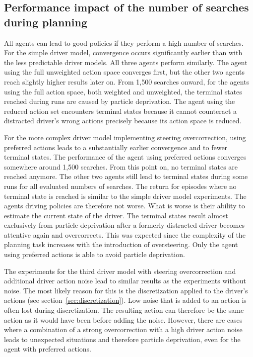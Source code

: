 \subsection{Performance impact of the number of searches during planning}

All agents can lead to good policies if they perform a high number of searches. For the simple driver model, convergence occurs significantly earlier than with the less predictable driver models. All three agents perform similarly. The agent using the full unweighted action space converges first, but the other two agents reach slightly higher results later on. From 1,500 searches onward, for the agents using the full action space, both weighted and unweighted, the terminal states reached during runs are caused by particle deprivation. The agent using the reduced action set encounters terminal states because it cannot counteract a distracted driver's wrong actions precisely because its action space is reduced.

For the more complex driver model implementing steering overcorrection, using preferred actions leads to a substantially earlier convergence and to fewer terminal states. The performance of the agent using preferred actions converges somewhere around 1,500 searches. From this point on, no terminal states are reached anymore. The other two agents still lead to terminal states during some runs for all evaluated numbers of searches. The return for episodes where no terminal state is reached is similar to the simple driver model experiments. The agents driving policies are therefore not worse. What is worse is their ability to estimate the current state of the driver. The terminal states result almost exclusively from particle deprivation after a formerly distracted driver becomes attentive again and overcorrects. This was expected since the complexity of the planning task increases with the introduction of oversteering. Only the agent using preferred actions is able to avoid particle deprivation.

The experiments for the third driver model with steering overcorrection and additional driver action noise lead to similar results as the experiments without noise. The most likely reason for this is the discretization applied to the driver's actions (see section~\ref{sec:discretization}). Low noise that is added to an action is often lost during discretization. The resulting action can therefore be the same action as it would have been before adding the noise. However, there are cases where a combination of a strong overcorrection with a high driver action noise leads to unexpected situations and therefore particle deprivation, even for the agent with preferred actions.

